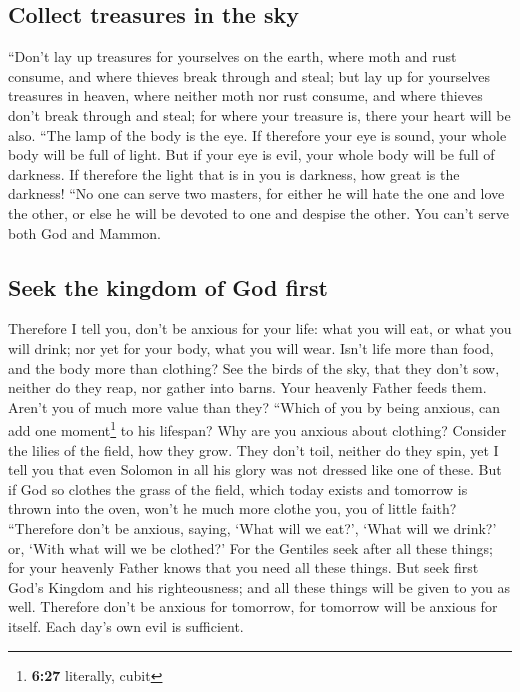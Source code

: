 \hypertarget{collect-treasures-in-the-sky}{%
\subsection{Collect treasures in the
sky}\label{collect-treasures-in-the-sky}}

 ``Don't lay up treasures for yourselves on the earth,
where moth and rust consume, and where thieves break through and steal;
 but lay up for yourselves treasures in heaven, where
neither moth nor rust consume, and where thieves don't break through and
steal;  for where your treasure is, there your heart will
be also.  ``The lamp of the body is the eye. If therefore
your eye is sound, your whole body will be full of light.
 But if your eye is evil, your whole body will be full of
darkness. If therefore the light that is in you is darkness, how great
is the darkness!  ``No one can serve two masters, for
either he will hate the one and love the other, or else he will be
devoted to one and despise the other. You can't serve both God and
Mammon.

\hypertarget{seek-the-kingdom-of-god-first}{%
\subsection{Seek the kingdom of God
first}\label{seek-the-kingdom-of-god-first}}

 Therefore I tell you, don't be anxious for your life:
what you will eat, or what you will drink; nor yet for your body, what
you will wear. Isn't life more than food, and the body more than
clothing?  See the birds of the sky, that they don't sow,
neither do they reap, nor gather into barns. Your heavenly Father feeds
them. Aren't you of much more value than they?  ``Which
of you by being anxious, can add one moment\footnote{\textbf{6:27}
  literally, cubit} to his lifespan?  Why are you anxious
about clothing? Consider the lilies of the field, how they grow. They
don't toil, neither do they spin,  yet I tell you that
even Solomon in all his glory was not dressed like one of these.
 But if God so clothes the grass of the field, which
today exists and tomorrow is thrown into the oven, won't he much more
clothe you, you of little faith?  ``Therefore don't be
anxious, saying, `What will we eat?', `What will we drink?' or, `With
what will we be clothed?'  For the Gentiles seek after
all these things; for your heavenly Father knows that you need all these
things.  But seek first God's Kingdom and his
righteousness; and all these things will be given to you as well.
 Therefore don't be anxious for tomorrow, for tomorrow
will be anxious for itself. Each day's own evil is sufficient.

